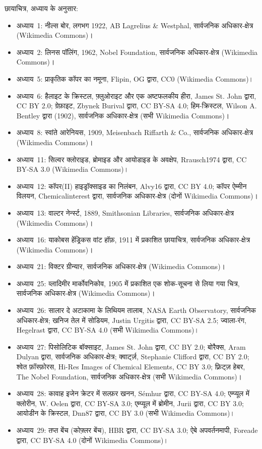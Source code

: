 \bigskip
\noindent छायाचित्र, अध्याय के अनुसार:
\begin{itemize}\small
  \item अध्याय~1: नील्स बोर, लगभग 1922, AB Lagrelius \& Westphal, सार्वजनिक
        अधिकार-क्षेत्र (Wikimedia Commons)।
  \item अध्याय~2: लिनस पॉलिंग, 1962, Nobel Foundation, सार्वजनिक अधिकार-क्षेत्र
        (Wikimedia Commons)।
  \item अध्याय~5: प्राकृतिक कॉपर का नमूना, Flipin, OG द्वारा, CC0 (Wikimedia
        Commons)।
  \item अध्याय~6: हैलाइट के क्रिस्टल, फ़्लुओराइट और एक अष्टफलकीय हीरा,
        James St. John द्वारा, CC BY 2.0; ग्रेफ़ाइट, Zbynek Burival द्वारा,
        CC BY-SA 4.0; हिम-क्रिस्टल, Wilson A. Bentley द्वारा (1902), सार्वजनिक
        अधिकार-क्षेत्र (सभी Wikimedia Commons)।
  \item अध्याय~8: स्वांते आरेनियस, 1909, Meisenbach Riffarth \& Co., सार्वजनिक
        अधिकार-क्षेत्र (Wikimedia Commons)।
  \item अध्याय~11: सिल्वर क्लोराइड, ब्रोमाइड और आयोडाइड के अवक्षेप,
        Rrausch1974 द्वारा, CC BY-SA 3.0 (Wikimedia Commons)।
  \item अध्याय~12: कॉपर(II) हाइड्रॉक्साइड का निलंबन, Alvy16 द्वारा, CC BY 4.0;
        कॉपर ऐम्मीन विलयन, Chemicalinterest द्वारा, सार्वजनिक अधिकार-क्षेत्र (दोनों
        Wikimedia Commons)।
  \item अध्याय~13: वाल्टर नेर्न्स्ट, 1889, Smithsonian Libraries, सार्वजनिक
        अधिकार-क्षेत्र (Wikimedia Commons)।
  \item अध्याय~16: याकोबस हेंड्रिकस वांट हॉफ़, 1911 में प्रकाशित छायाचित्र,
        सार्वजनिक अधिकार-क्षेत्र (Wikimedia Commons)।
  \item अध्याय~21: विक्टर ग्रीन्यार, सार्वजनिक अधिकार-क्षेत्र (Wikimedia Commons)।
  \item अध्याय~25: व्लादिमीर मार्कोवनिकोव, 1905 में प्रकाशित एक शोक-सूचना से लिया गया
        चित्र, सार्वजनिक अधिकार-क्षेत्र (Wikimedia Commons)।
  \item अध्याय~26: सालार दे अटाकामा के लिथियम तालाब, NASA Earth
        Observatory, सार्वजनिक अधिकार-क्षेत्र; खनिज तेल में सोडियम, Justin Urgitis द्वारा,
        CC BY-SA 2.5; ज्वाला-रंग, Hegelrast द्वारा, CC BY-SA 4.0 (सभी
        Wikimedia Commons)।
  \item अध्याय~27: पिसोलिटिक बॉक्साइट, James St. John द्वारा, CC BY 2.0; बोरैक्स,
        Aram Dulyan द्वारा, सार्वजनिक अधिकार-क्षेत्र; क्वार्ट्ज़, Stephanie Clifford द्वारा,
        CC BY 2.0; श्वेत फ़ॉस्फ़ोरस, Hi-Res Images of Chemical Elements, CC BY 3.0;
        फ़्रिट्ज़ हेबर, The Nobel Foundation, सार्वजनिक अधिकार-क्षेत्र (सभी Wikimedia
        Commons)।
  \item अध्याय~28: कावाह इजेन क्रेटर में सल्फ़र खनन, S\'emhur द्वारा,
        CC BY-SA 4.0; एम्प्यूल में क्लोरीन, W. Oelen द्वारा, CC BY-SA 3.0;
        एम्प्यूल में ब्रोमीन, Jurii द्वारा, CC BY 3.0; आयोडीन के क्रिस्टल,
        Dnn87 द्वारा, CC BY 3.0 (सभी Wikimedia Commons)।
  \item अध्याय~29: तप्त बेंच (कोफ़्लर बेंच), HBR द्वारा, CC BY-SA 3.0; ऐबे
        अपवर्तनमापी, Foreade द्वारा, CC BY-SA 4.0 (दोनों Wikimedia Commons)।
\end{itemize}
\clearpage
